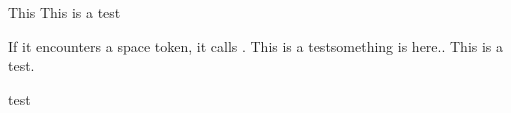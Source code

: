 \documentclass{book}
\makeatletter
\def\@test{This is a test}
\makeatother
\begin{document}
 This \@test

 If it encounters a space
    token, it calls \@xifnch.
   \@test  something is here.\@. This is a test.
 
 test 
\end{document}
